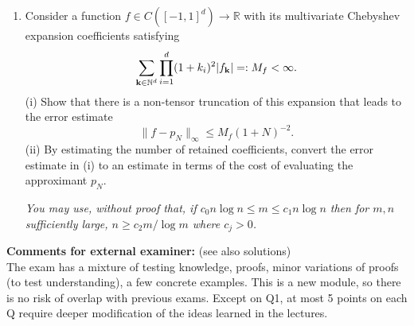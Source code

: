 \documentclass{exams}
\newcommand{\R}{\mathbb{R}}
\newcommand{\N}{\mathbb{N}}
\begin{document}
\begin{examcomp1}
\begin{question}
\begin{enumerate}
  (ii) Estimate the computational cost of evaluating $p({\bf x})$ at a single
  point ${\bf x}  \in \R^d$.

  (iii) Suppose that for all $i = 1, \dots, d$, $x_i \mapsto f({\bf x})$ is analytic in $E(\rho)$ (with $x_j, j \neq i$
  remaining fixed) where $E(\rho)$ is the usual Bernstein ellipse. Prove the following tensor product polynomial
  approximation in the max-norm, defining what we mean by $\tilde{\Pi}_N^{(i)}$,
   \[ 
      \|f - \tilde\Pi_N^{(d)} \cdots \tilde\Pi_N^{(1)} f \|_\infty 
      \leq C (\log N)^d \rho^{-N}.
   \]
  {\it You may use \eqref{eq:approxcheb} without proof, as well as 
  the bound $\| \tilde\Pi_N g \|_\infty 
  \leq C \log N \|g\|_\infty$ for $g \in C([-1,1])$.}
  
  (iv)  Convert the result from (iii) into an estimate in terms of the cost
  of storing and evaluating the multivariate polynomial, and thus explain the
  term ``curse of dimensionality''. 
  
  \item Consider a function $f \in C([-1,1]^d) \to \R$ with its multivariate 
  Chebyshev expansion coefficients satisfying 
  \[
      \sum_{{\bf k} \in \N^d} \prod_{i=1}^d (1+k_i)^2 |f_{\bf k}| =: M_f < \infty.
  \]
  (i) Show that there is a non-tensor truncation of this expansion
  that leads to the error estimate  
  \[
      \| f - p_N \|_\infty \leq M_f (1+N)^{-2}.
  \]
   (ii) By estimating the number of retained coefficients, convert the error 
   estimate in (i) to an estimate in terms of the cost of evaluating the 
   approximant $p_N$. 
   
  {\it You may use, without proof that, if $c_0 n \log n \leq m \leq c_1 n \log n$ then 
  for $m, n$ sufficiently large, 
  $n \geq c_2 m /
  \log m$ where $c_j > 0$. }

  \end{enumerate}
\end{question}


%
\end{examcomp1}

\clearpage 

{\bf Comments for external examiner: } (see also solutions) \\ The exam has a
mixture of testing knowledge, proofs, minor variations of proofs (to test
understanding), a few concrete examples. This is a new module, so there is no
risk of overlap with previous exams. Except on Q1, at most 5 points on each Q
require deeper modification of the ideas learned in the lectures.
\end{document}
